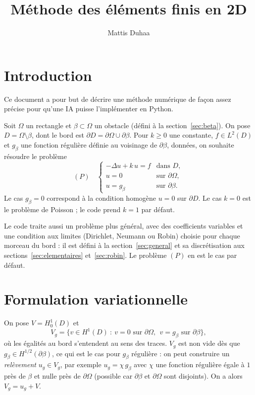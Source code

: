 \documentclass[11pt,a4paper]{article}
\title{Méthode des éléments finis en 2D}
\author{Mattis Duhaa}
\date{}
\begin{document}
\maketitle

\section{Introduction}

Ce document a pour but de décrire une méthode numérique de façon assez
précise pour qu'une IA puisse l'implémenter en Python.

Soit $\Omega$ un rectangle et $\beta \subset \Omega$ un obstacle (défini à la
section~\ref{sec:beta}). On pose $D = \Omega \setminus \beta$, dont le bord
est $\partial D = \partial\Omega \cup \partial\beta$. Pour $k \ge 0$ une
constante, $f \in L^2(D)$ et $g_\beta$ une fonction régulière définie au
voisinage de $\partial\beta$, données, on souhaite résoudre le problème
\[
(P)\quad
\begin{cases}
-\Delta u + k\, u = f & \text{dans } D,\\[2pt]
u = 0 & \text{sur } \partial \Omega ,\\[2pt]
u = g_\beta & \text{sur } \partial \beta .
\end{cases}
\]
Le cas $g_\beta = 0$ correspond à la condition homogène $u = 0$ sur
$\partial D$. Le cas $k = 0$ est le problème de Poisson ; le code prend
$k = 1$ par défaut.

Le code traite aussi un problème plus général, avec des coefficients
variables et une condition aux limites (Dirichlet, Neumann ou Robin) choisie
pour chaque morceau du bord : il est défini à la section~\ref{sec:general}
et sa discrétisation aux sections~\ref{sec:elementaires}
et~\ref{sec:robin}. Le problème $(P)$ en est le cas par défaut.

\section{Formulation variationnelle}

On pose $V = H^1_0(D)$ et
\[
V_g = \big\{ v \in H^1(D) \ :\ v = 0 \text{ sur } \partial\Omega,\ \
v = g_\beta \text{ sur } \partial\beta \big\},
\]
où les égalités au bord s'entendent au sens des traces. $V_g$ est non vide
dès que $g_\beta \in H^{1/2}(\partial\beta)$, ce qui est le cas pour
$g_\beta$ régulière : on peut construire un \emph{relèvement}
$u_g \in V_g$, par exemple $u_g = \chi\, g_\beta$ avec $\chi$ une fonction
régulière égale à $1$ près de $\beta$ et nulle près de $\partial\Omega$
(possible car $\partial\beta$ et $\partial\Omega$ sont disjoints). On a
alors $V_g = u_g + V$.
\end{document}
